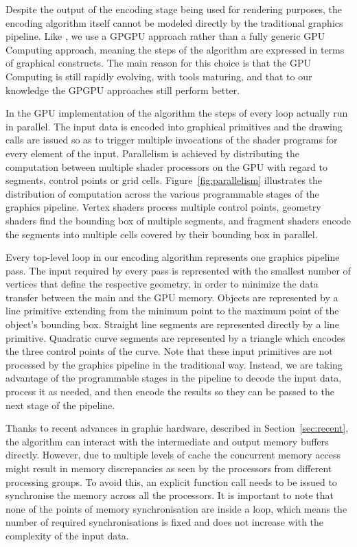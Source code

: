 \documentclass[11pt,a4paper,twoside]{article}
\begin{document}
Despite the output of the encoding stage being used for rendering purposes, the encoding algorithm itself cannot be modeled directly by the traditional graphics pipeline. Like \cite{NehabHoppe08}, we use a GPGPU approach rather than a fully generic GPU Computing approach, meaning the steps of the algorithm are expressed in terms of graphical constructs. The main reason for this choice is that the GPU Computing is still rapidly evolving, with tools maturing, and that to our knowledge the GPGPU approaches still perform better.

In the GPU implementation of the algorithm the steps of every loop actually run in parallel. The input data is encoded into graphical primitives and the drawing calls are issued so as to trigger multiple invocations of the shader programs for every element of the input. Parallelism is achieved by distributing the computation between multiple shader processors on the GPU with regard to segments, control points or grid cells. Figure~\ref{fig:parallelism} illustrates the distribution of computation across the various programmable stages of the graphics pipeline. Vertex shaders process multiple control points, geometry shaders find the bounding box of multiple segments, and fragment shaders encode the segments into multiple cells covered by their bounding box in parallel.

Every top-level loop in our encoding algorithm represents one graphics pipeline pass. The input required by every pass is represented with the smallest number of vertices that define the respective geometry, in order to minimize the data transfer between the main and the GPU memory. Objects are represented by a line primitive extending from the minimum point to the maximum point of the object's bounding box. Straight line segments are represented directly by a line primitive. Quadratic curve segments are represented by a triangle which encodes the three control points of the curve. Note that these input primitives are not processed by the graphics pipeline in the traditional way. Instead, we are taking advantage of the programmable stages in the pipeline to decode the input data, process it as needed, and then encode the results so they can be passed to the next stage of the pipeline.

Thanks to recent advances in graphic hardware, described in Section~\ref{sec:recent}, the algorithm can interact with the intermediate and output memory buffers directly. However, due to multiple levels of cache the concurrent memory access might result in memory discrepancies as seen by the processors from different processing groups. To avoid this, an explicit function call needs to be issued to synchronise the memory across all the processors. It is important to note that none of the points of memory synchronisation are inside a loop, which means the number of required synchronisations is fixed and does not increase with the complexity of the input data. 
\end{document}

